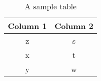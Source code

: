 \begin{table}
\centering
\begin{tabular}{|c|c|}\hline
Column 1 & Column 2 \\\hline\hline
z & s \\
x & t \\
y & w \\\hline
\end{tabular}

\caption{A sample table}
\label{table-sample}
\end{table}